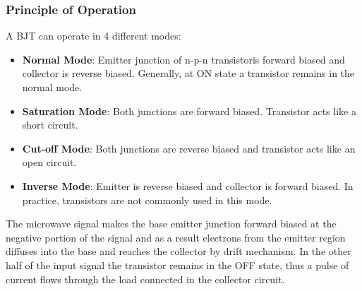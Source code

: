 \begin{frame}
  \frametitle{Principle of Operation}
  A BJT can operate in 4 different modes:
  \begin{itemize}
  \item \textbf{Normal Mode}: Emitter junction of n-p-n transistoris forward biased and collector is reverse biased. Generally, at ON state a transistor remains in the normal mode.
  \item \textbf{Saturation Mode}: Both junctions are forward biased. Transistor acts like a short circuit.
  \item \textbf{Cut-off Mode}: Both junctions are reverse biased and transistor acts like an open circuit.
  \item \textbf{Inverse Mode}: Emitter is reverse biased and collector is forward biased. In practice, transistors are not commonly used in this mode.
  \end{itemize}
\end{frame}

\begin{frame}
    The microwave signal makes the base emitter junction forward biased at the negative portion of the signal and as a result electrons from the emitter region diffuses into the base and reaches the collector by drift mechanism. In the other half of the input signal the transistor remains in the OFF state, thus a pulse of current flows through the load connected in the collector circuit.
\end{frame}